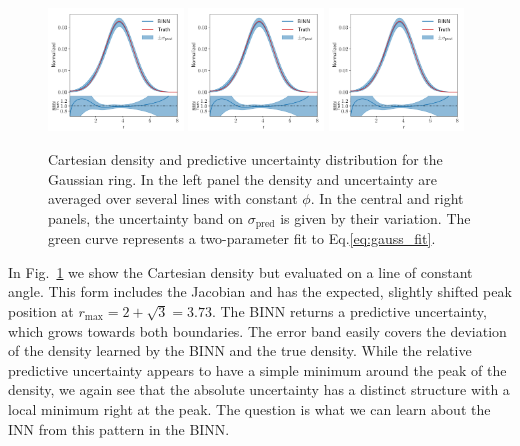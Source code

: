 \begin{figure}[t]
\centering
\includegraphics[width=0.32\textwidth, page=1]{./figures/bINN/gauss_ring_1dplots}
\includegraphics[width=0.32\textwidth, page=2]{./figures/bINN/gauss_ring_1dplots}
\includegraphics[width=0.32\textwidth, page=3]{./figures/bINN/gauss_ring_1dplots}
\caption{Cartesian density and predictive uncertainty distribution for
  the Gaussian ring. In the left panel the density and uncertainty are
  averaged over several lines with constant $\phi$. In the central and
  right panels, the uncertainty band on $\sigma_\text{pred}$ is given
  by their variation.  The green curve represents a two-parameter fit
  to Eq.\eqref{eq:gauss_fit}.}
\label{fig:gauss_unc}
\end{figure}

In Fig.~\ref{fig:gauss_unc} we show the Cartesian density but
evaluated on a line of constant angle. This form includes the Jacobian
and has the expected, slightly shifted peak position at $r_\text{max}
= 2 + \sqrt{3} = 3.73$. The BINN returns a predictive uncertainty,
which grows towards both boundaries.  The error band easily covers the
deviation of the density learned by the BINN and the true
density. While the relative predictive uncertainty appears to have a
simple minimum around the peak of the density, we again see that the
absolute uncertainty has a distinct structure with a local minimum
right at the peak. The question is what we can learn about the INN
from this pattern in the BINN.


